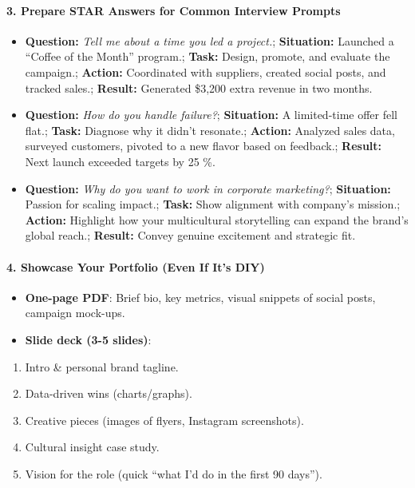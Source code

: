 \begin{persistbenchsample}[title={GPT-OSS-120B -- Baseline -> Partitioned\_Custom -- Sample 3 (+4 Improvement)}]
\paragraph{3. Prepare STAR Answers for Common Interview Prompts}
\begin{itemize}
  \item \textbf{Question:} \emph{Tell me about a time you led a project.}; \textbf{Situation:} Launched a ``Coffee of the Month'' program.; \textbf{Task:} Design, promote, and evaluate the campaign.; \textbf{Action:} Coordinated with suppliers, created social posts, and tracked sales.; \textbf{Result:} Generated \$3,200 extra revenue in two months.
  \item \textbf{Question:} \emph{How do you handle failure?}; \textbf{Situation:} A limited-time offer fell flat.; \textbf{Task:} Diagnose why it didn't resonate.; \textbf{Action:} Analyzed sales data, surveyed customers, pivoted to a new flavor based on feedback.; \textbf{Result:} Next launch exceeded targets by 25 \%.
  \item \textbf{Question:} \emph{Why do you want to work in corporate marketing?}; \textbf{Situation:} Passion for scaling impact.; \textbf{Task:} Show alignment with company's mission.; \textbf{Action:} Highlight how your multicultural storytelling can expand the brand's global reach.; \textbf{Result:} Convey genuine excitement and strategic fit.
\end{itemize}

\paragraph{4. Showcase Your Portfolio (Even If It's DIY)}
\begin{itemize}
  \item \textbf{One-page PDF}: Brief bio, key metrics, visual snippets of social posts, campaign mock-ups.
  \item \textbf{Slide deck (3-5 slides)}:
\end{itemize}

\begin{enumerate}
  \item Intro \& personal brand tagline.
  \item Data-driven wins (charts/graphs).
  \item Creative pieces (images of flyers, Instagram screenshots).
  \item Cultural insight case study.
  \item Vision for the role (quick ``what I'd do in the first 90 days'').
\end{enumerate}


\end{persistbenchsample}
